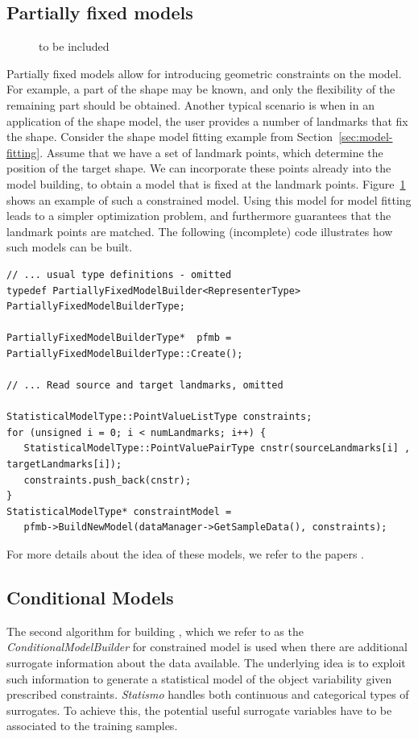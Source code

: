 \documentclass{InsightArticle}
\newcommand{\Statismo}{\emph{Statismo}\xspace}
\begin{document}
\subsection{Partially fixed models}
\begin{figure}
  to be included
    \label{fig:constrained-model}
\end{figure}
Partially fixed models allow for introducing geometric constraints on the model. For example, a part of the shape may be known, and only the flexibility of the remaining part should be obtained. Another typical scenario is when in an application of the shape model, the user provides a number of landmarks that fix the shape. 
Consider the shape model fitting example from Section~\ref{sec:model-fitting}. Assume that we have a set of landmark points, which determine the position of the target shape. We can incorporate these points already into the model building, to obtain a model that is fixed at the landmark points. Figure~\ref{fig:constrained-model} shows an example of such a  constrained model.  Using this model for model fitting leads to a simpler optimization problem, and furthermore guarantees that the landmark points are matched. 
The following (incomplete) code illustrates how such models can be built. 

\begin{verbatim}
// ... usual type definitions - omitted
typedef PartiallyFixedModelBuilder<RepresenterType> PartiallyFixedModelBuilderType;

PartiallyFixedModelBuilderType*  pfmb = PartiallyFixedModelBuilderType::Create();

// ... Read source and target landmarks, omitted

StatisticalModelType::PointValueListType constraints;
for (unsigned i = 0; i < numLandmarks; i++) { 
   StatisticalModelType::PointValuePairType cnstr(sourceLandmarks[i] , targetLandmarks[i]);
   constraints.push_back(cnstr);
}
StatisticalModelType* constraintModel = 
   pfmb->BuildNewModel(dataManager->GetSampleData(), constraints);
\end{verbatim}

For more details about the idea of these models, we refer to the papers \cite{Mathsurface, PriorDeformation}.

\subsection{Conditional Models}
The second algorithm for building , which we refer to as the
\emph{ConditionalModelBuilder} for constrained model is used when
there are additional surrogate information about the data available.
The underlying idea is to exploit such information to generate a
statistical model of the object variability given prescribed
constraints. \Statismo handles both continuous and categorical types
of surrogates.  To achieve this, the potential useful surrogate
variables have to be associated to the training samples.
\end{document}
